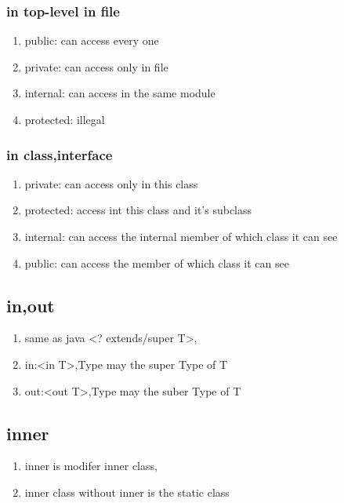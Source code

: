 \documentclass{article}
\begin{document}
            \subsubsection{in top-level in file}
                 \begin{enumerate}
                    \item public: can access every one
                    \item private: can access only in file
                    \item internal: can access in the same module
                    \item protected: illegal
                 \end{enumerate}
            \subsubsection{in class,interface}
                \begin{enumerate}
                    \item private: can access only in this class
                    \item protected: access int this class and it's subclass
                    \item internal: can access the internal member of which class it can see 
                    \item public: can access the member of which class it can see
                \end{enumerate}
            \subsection{in,out}
                \begin{enumerate}
                    \item same as java <? extends/super T>,
                    \item in:<in T>,Type may the super Type of T
                    \item out:<out T>,Type may the suber Type of T
                \end{enumerate}
            \subsection{inner}
                \begin{enumerate}
                    \item inner is modifer inner class,
                    \item inner class without inner is the static class
                \end{enumerate}
\end{document}

